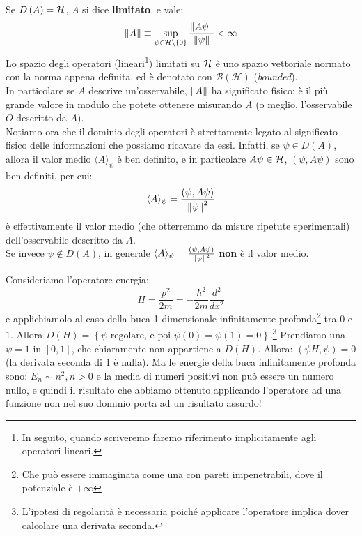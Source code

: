 \documentclass[FisicaTeorica.tex]{subfiles}
\begin{document}
	Se $D\left(A\right)=\mathcal{H}$, $A$ si dice \textbf{limitato}, e vale:
	\[
	\left\lVert A\right\rVert \equiv \sup_{\psi \in \mathcal{H} \setminus \{0\}} \frac{\left\lVert A\psi\right\rVert}{\left\lVert\psi\right\rVert} < \infty
	\]
	Lo spazio degli operatori (lineari\footnote{In seguito, quando scriveremo  faremo riferimento implicitamente agli operatori lineari.}) limitati su $\mathcal{H}$ è uno spazio vettoriale normato con la norma appena definita, ed è denotato con $\mathcal{B}\left(\mathcal{H}\right)$ (\textit{bounded}).\\
	In particolare se $A$ descrive un'osservabile, $\left\lVert A\right\rVert$ ha significato fisico: è il più grande valore in modulo che potete ottenere misurando $A$ (o meglio, l'osservabile $O$ descritto da $A$).\\
	Notiamo ora che il dominio degli operatori è strettamente legato al significato fisico delle informazioni che possiamo ricavare da essi.
	Infatti, se $\psi \in D(A)$, allora il valor medio $\langle A\rangle_\psi$ è ben definito, e in particolare $A\psi\in \mathcal{H}$, $(\psi, A\psi)$ sono ben definiti, per cui: 
	\[
	\langle A \rangle_\psi = \frac{(\psi,A\psi)}{\left\lVert\psi\right\rVert^2}
	\]
	è effettivamente il valor medio (che otterremmo da misure ripetute sperimentali) dell'osservabile descritto da $A$.\\
	Se invece $\psi \notin D(A)$, in generale $\langle A\rangle_\psi = \frac{(\psi, A\psi)}{\left\lVert\psi\right\rVert^2}$ \textbf{non} è il valor medio.\\
	\begin{es}
	Consideriamo l'operatore energia: 
	\[H=\frac{p^2}{2m}=-\frac{\hbar^2}{2m}\frac{d^2}{dx^2}\]
	e applichiamolo al caso della buca 1-dimensionale infinitamente profonda\footnote{Che può essere immaginata come una  con pareti impenetrabili, dove il potenziale è $+\infty$} tra $0$ e $1$.
	Allora $D\left(H\right)=\left\{\psi\text{\ regolare,\ e\ poi\ } \psi\left(0\right)=\psi\left(1\right)=0\right\}$.\footnote{L'ipotesi di regolarità è necessaria poiché applicare l'operatore implica dover calcolare una derivata seconda.}
	Prendiamo una $\psi=1$ in $[0,1]$, che chiaramente non appartiene a $D(H)$. 
	Allora:
	$\left(\psi H,\psi\right)=0$ (la derivata seconda di $1$ è nulla).
	Ma le energie della buca infinitamente profonda sono: $E_n\sim n^2, n>0$ e la media di numeri positivi non può essere un numero nullo, e quindi il risultato che abbiamo ottenuto applicando l'operatore ad una funzione non nel suo dominio porta ad un risultato assurdo!
	\end{es}
\end{document}
